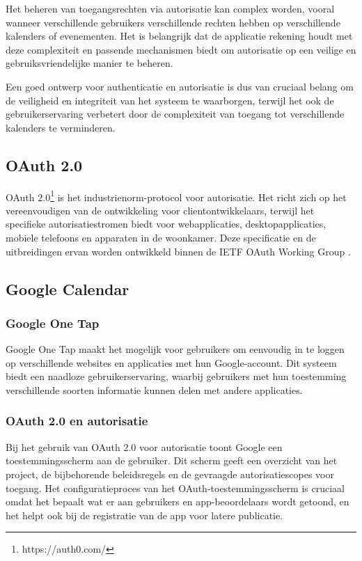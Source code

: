 Het beheren van toegangsrechten via autorisatie kan complex worden, vooral wanneer verschillende gebruikers verschillende rechten hebben op verschillende kalenders of evenementen. Het is belangrijk dat de applicatie rekening houdt met deze complexiteit en passende mechanismen biedt om autorisatie op een veilige en gebruiksvriendelijke manier te beheren.

Een goed ontwerp voor authenticatie en autorisatie is dus van cruciaal belang om de veiligheid en integriteit van het systeem te waarborgen, terwijl het ook de gebruikerservaring verbetert door de complexiteit van toegang tot verschillende kalenders te verminderen.

\subsection{OAuth 2.0}
OAuth 2.0\footnote{https://auth0.com/} is het industrienorm-protocol voor autorisatie. Het richt zich op het vereenvoudigen van de ontwikkeling voor clientontwikkelaars, terwijl het specifieke autorisatiestromen biedt voor webapplicaties, desktopapplicaties, mobiele telefoons en apparaten in de woonkamer. Deze specificatie en de uitbreidingen ervan worden ontwikkeld binnen de IETF OAuth Working Group \autocite{Parecki2012}.



\newpage



\subsection{Google Calendar}
\subsubsection{Google One Tap}
Google One Tap maakt het mogelijk voor gebruikers om eenvoudig in te loggen op verschillende websites en applicaties met hun Google-account. Dit systeem biedt een naadloze gebruikerservaring, waarbij gebruikers met hun toestemming verschillende soorten informatie kunnen delen met andere applicaties.

\subsubsection{OAuth 2.0 en autorisatie}
Bij het gebruik van OAuth 2.0 voor autorisatie toont Google een toestemmingsscherm aan de gebruiker. Dit scherm geeft een overzicht van het project, de bijbehorende beleidsregels en de gevraagde autorisatiescopes voor toegang. Het configuratieproces van het OAuth-toestemmingsscherm is cruciaal omdat het bepaalt wat er aan gebruikers en app-beoordelaars wordt getoond, en het helpt ook bij de registratie van de app voor latere publicatie.

